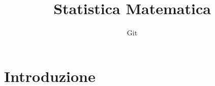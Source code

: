 \documentclass[11pt]{article}
\title{Statistica Matematica}
\author{Git}
\date{}
\begin{document}
\maketitle


\section{Introduzione}



\end{document}
